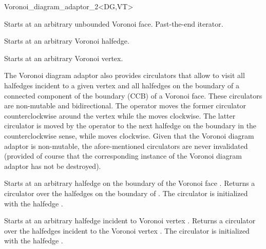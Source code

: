 \begin{ccRefClass}{Voronoi_diagram_adaptor_2<DG,VT>}
\ccGlue
{}

{Starts at an arbitrary unbounded Voronoi face.}
\ccGlue
{}
{Past-the-end iterator.}

\ccGlue
{}

{Starts at an arbitrary Voronoi halfedge.}
\ccGlue
{}

{Starts at an arbitrary Voronoi vertex.}
\ccGlue
{}





The Voronoi diagram adaptor also provides circulators that allow to visit 
all halfedges incident to a given vertex and all halfedges
on the boundary of a connected component of the boundary (CCB) of a
Voronoi face. These circulators are non-mutable and bidirectional.
The operator  moves the former circulator counterclockwise
around the vertex while the  moves clockwise.
The latter circulator is moved by the operator  to the
next halfedge on the boundary in the counterclockwise sense, while
 moves clockwise.
Given that the Voronoi diagram adaptor is non-mutable, the
afore-mentioned circulators are never invalidated (provided of course
that the corresponding instance of the Voronoi diagram adaptor has not
be destroyed).

\ccThreeToTwo
%
{Starts at an arbitrary halfedge on the boundary of the Voronoi face
  .}
\ccGlue
{} 
{Returns a circulator over the halfedges on the boundary of
  . The circulator is initialized with the halfedge .
  }

\ccThreeToTwo
%
{Starts at an arbitrary halfedge incident to Voronoi vertex .}
\ccGlue
{}
{Returns a circulator over the halfedges incident to the Voronoi
  vertex . The circulator is initialized with the halfedge
  .
  }



\end{ccRefClass}
